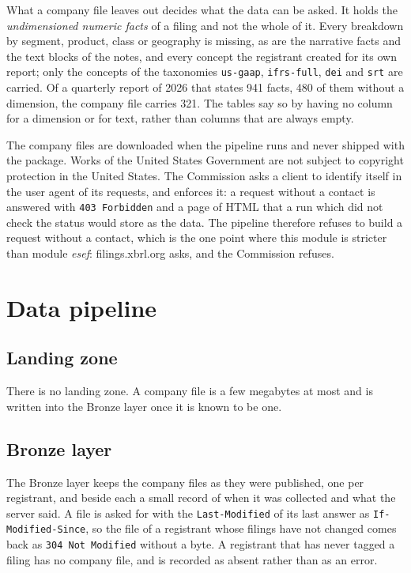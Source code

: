 What a company file leaves out decides what the data can be asked. It holds the \emph{undimensioned numeric facts} of a filing and not the whole of it. Every breakdown by segment, product, class or geography is missing, as are the narrative facts and the text blocks of the notes, and every concept the registrant created for its own report; only the concepts of the taxonomies \verb|us-gaap|, \verb|ifrs-full|, \verb|dei| and \verb|srt| are carried. Of a quarterly report of 2026 that states 941 facts, 480 of them without a dimension, the company file carries 321. The tables say so by having no column for a dimension or for text, rather than columns that are always empty.

The company files are downloaded when the pipeline runs and never shipped with the package. Works of the United States Government are not subject to copyright protection in the United States. The Commission asks a client to identify itself in the user agent of its requests, and enforces it: a request without a contact is answered with \verb|403 Forbidden| and a page of HTML that a run which did not check the status would store as the data. The pipeline therefore refuses to build a request without a contact, which is the one point where this module is stricter than module \emph{esef}: filings.xbrl.org asks, and the Commission refuses.

\section{Data pipeline}

\subsection{Landing zone}

There is no landing zone. A company file is a few megabytes at most and is written into the Bronze layer once it is known to be one.

\subsection{Bronze layer}

The Bronze layer keeps the company files as they were published, one per registrant, and beside each a small record of when it was collected and what the server said. A file is asked for with the \verb|Last-Modified| of its last answer as \verb|If-Modified-Since|, so the file of a registrant whose filings have not changed comes back as \verb|304 Not Modified| without a byte. A registrant that has never tagged a filing has no company file, and is recorded as absent rather than as an error.

